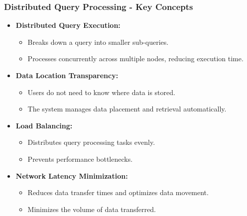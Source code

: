 \documentclass[aspectratio=169]{beamer}
\begin{document}
\begin{frame}[fragile]
    \frametitle{Distributed Query Processing - Key Concepts}
    \begin{itemize}
        \item \textbf{Distributed Query Execution:}
            \begin{itemize}
                \item Breaks down a query into smaller sub-queries.
                \item Processes concurrently across multiple nodes, reducing execution time.
            \end{itemize}
        \item \textbf{Data Location Transparency:}
            \begin{itemize}
                \item Users do not need to know where data is stored.
                \item The system manages data placement and retrieval automatically.
            \end{itemize}
        \item \textbf{Load Balancing:}
            \begin{itemize}
                \item Distributes query processing tasks evenly.
                \item Prevents performance bottlenecks.
            \end{itemize}
        \item \textbf{Network Latency Minimization:}
            \begin{itemize}
                \item Reduces data transfer times and optimizes data movement.
                \item Minimizes the volume of data transferred.
            \end{itemize}
    \end{itemize}
\end{frame}
\end{document}
